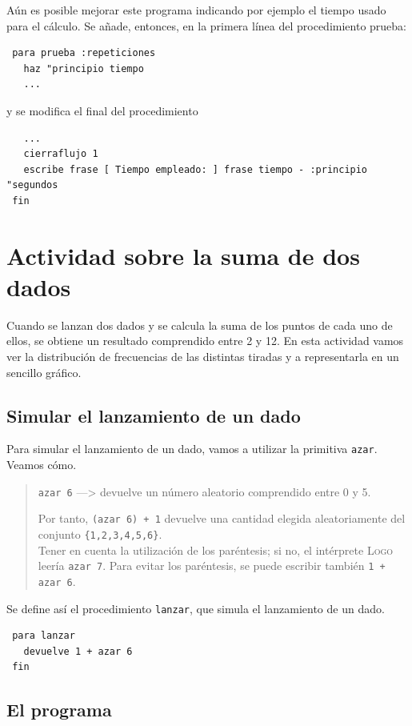 \documentclass[12pt,twoside,spanish,a4paper]{report}
\begin{document}
A\'un es posible mejorar este programa indicando por ejemplo el tiempo
usado para el c\'alculo. Se a\~nade, entonces, en la primera l\'inea del
procedimiento prueba:
\begin{verbatim}
 para prueba :repeticiones
   haz "principio tiempo
   ... \end{verbatim}
y se modifica el final del procedimiento
\begin{verbatim}
   ...
   cierraflujo 1
   escribe frase [ Tiempo empleado: ] frase tiempo - :principio "segundos
 fin \end{verbatim}

\newpage{}

\chapter{Actividad sobre la suma de dos dados}

Cuando se lanzan dos dados y se calcula la suma de los puntos de cada uno de
ellos, se obtiene un resultado comprendido entre 2 y 12. En esta actividad
vamos ver la distribuci\'on de frecuencias de las distintas tiradas y a
representarla en un sencillo gr\'afico.

\section{Simular el lanzamiento de un dado}

Para simular el lanzamiento de un dado, vamos a utilizar la primitiva
\texttt{azar}. Veamos c\'omo.
\begin{quote}
  \texttt{azar 6} ---> devuelve un n\'umero aleatorio comprendido
     entre 0 y 5.

  Por tanto, \texttt{(azar 6) + 1} devuelve una cantidad elegida aleatoriamente
  del conjunto \texttt{\{1,2,3,4,5,6\}}. \\

  Tener en cuenta la utilizaci\'on de los par\'entesis; si no, el int\'erprete
  \textsc{Logo} leer\'ia \texttt{azar 7}. Para evitar los par\'entesis, se puede
  escribir tambi\'en \texttt{1 + azar 6}.
\end{quote}
Se define as\'i el procedimiento \texttt{lanzar}, que simula el lanzamiento de un
dado.
\begin{verbatim}
 para lanzar
   devuelve 1 + azar 6
 fin \end{verbatim}

\section{El programa}
\end{document}
